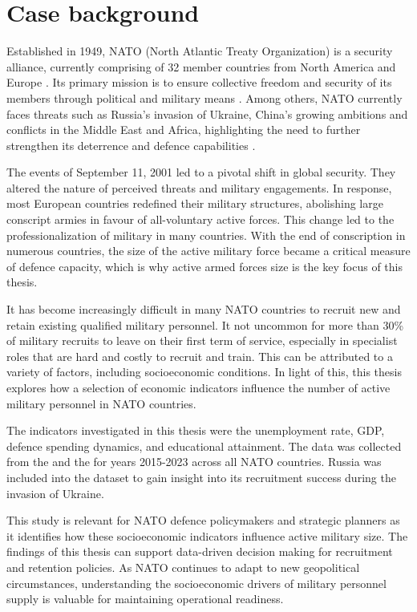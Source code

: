 \chapter{Case background}

Established in 1949, NATO (North Atlantic Treaty Organization) is a security
alliance, currently
comprising of 32 member countries from North America and Europe \parencite{nato_what_nodate, us_mission_to_nato_about_nodate}.
Its primary mission is to ensure collective freedom and security of its members through 
political and military means \parencite{us_mission_to_nato_about_nodate}. Among others, NATO currently faces 
threats such as  Russia's invasion of Ukraine, China's growing ambitions and conflicts 
in the Middle East and Africa, highlighting the need to further strengthen its deterrence 
and defence capabilities \parencite{nato_nato_2022}.

The events of September 11, 2001 led to a pivotal shift in global security. They altered the nature 
of perceived threats and military engagements. In response, most European countries redefined their 
military structures, abolishing large conscript armies in favour of all-voluntary active forces. 
This change led to the professionalization of military in many countries. \parencite{herranen_professional_2004}
With the end of conscription in numerous countries, the size of the active military force 
became a critical measure of defence capacity, which is why active armed forces size 
is the key focus of this thesis.

It has become increasingly difficult in many NATO countries to recruit new 
and retain existing qualified military personnel. 
It not uncommon for more than 30\% of military recruits to leave on their first term of service, 
especially in specialist roles that are hard and costly to recruit and train.
This can be attributed to 
a variety of factors, including socioeconomic conditions. \parencite{nato_research_and_technology_organization_recruiting_2007}
In light of this, this thesis explores how a selection of economic indicators 
influence the number of active military personnel in NATO countries.

The indicators investigated in this thesis were the unemployment rate, GDP, defence spending dynamics, 
and educational attainment. The data was collected from the \textcite{noauthor_world_bank_nodate} 
and the \textcite{noauthor_military_balance_nodate}
for years 2015-2023 across all NATO countries. Russia was included into the dataset to gain insight 
into its recruitment success during the invasion of Ukraine.

This study is relevant for NATO defence policymakers and strategic planners as it identifies how 
these socioeconomic indicators influence active military size. The findings of this thesis can 
support data-driven decision making for recruitment and retention policies. As NATO continues to 
adapt to new geopolitical circumstances, understanding the socioeconomic drivers of military 
personnel supply is valuable for maintaining operational readiness.
